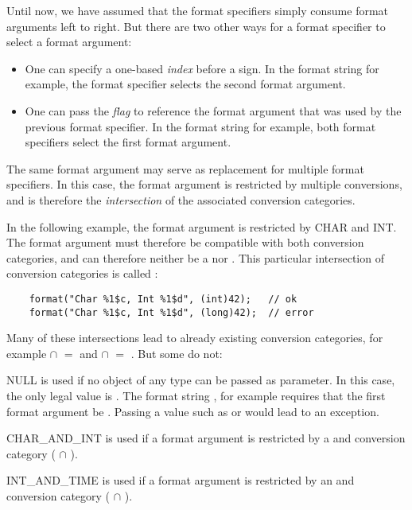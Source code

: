 Until now, we have assumed that the format specifiers simply consume format arguments left to right.
But there are two other ways for a format specifier to select a format argument:

\begin{itemize}
\item One can specify a one-based \emph{index} before a \code{\$} sign. In the
    format string  for example, the format specifier selects the
    second format argument.  
\item One can pass the \code{<} \emph{flag} to reference the format argument
    that was used by the previous format specifier. In the format string
     for example, both format specifiers select the first
    format argument.
\end{itemize}

\noindent The same format argument may serve as replacement for multiple format specifiers. In
this case, the format argument is restricted by multiple conversions, and is therefore the
\emph{intersection} of the associated conversion categories. 

In the following example, the format argument is restricted by CHAR and
INT.  The format argument must therefore be compatible with both conversion
categories, and can therefore neither be a  nor .
This particular intersection of conversion categories is called
:

\begin{Verbatim}
    format("Char %1$c, Int %1$d", (int)42);   // ok
    format("Char %1$c, Int %1$d", (long)42);  // error
\end{Verbatim}
 
\noindent Many of these intersections lead to already existing conversion categories,
for example  $\cap$  $=$  and 
 $\cap$  $=$ . But some do not:

\begin{description}
\item{NULL} is used if no object of any type can be
    passed as parameter. In this case, the only legal value is .
    The format string , for example requires that the first
    format argument be .  Passing a value such as  or
     would lead to an exception.
\item{CHAR\_AND\_INT} is used if a format argument is restricted by a  and  conversion category ( $\cap$ ).
\item{INT\_AND\_TIME} is used if a format argument is restricted by an  and  conversion category ( $\cap$ ).
\end{description}

